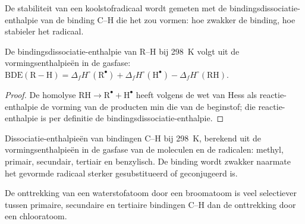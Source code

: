 De stabiliteit van een koolstofradicaal wordt gemeten met de
bindingsdissociatie-enthalpie van de binding C--H die het zou vormen:
hoe zwakker de binding, hoe stabieler het radicaal.

\begin{proposition}\label{prop:b3:radicals-carbenes:bde}
De bindingsdissociatie-enthalpie van R--H bij \qty{298}{K} volgt uit de
vormingsenthalpieën in de gasfase:
$\mathrm{BDE(R{-}H)} = \Delta_fH^\circ(\mathrm R^\bullet) + \Delta_fH^\circ(\mathrm H^\bullet) - \Delta_fH^\circ(\mathrm{RH})$.
\end{proposition}

\begin{proof}
De homolyse $\mathrm{RH \to R^\bullet + H^\bullet}$ heeft volgens de wet van Hess als reactie-enthalpie de vorming van
de producten min die van de beginstof; die reactie-enthalpie is per
definitie de bindingsdissociatie-enthalpie.
\end{proof}

\begin{omfigure}

{\small Dissociatie-enthalpieën van bindingen C--H bij \qty{298}{K},
berekend uit de vormingsenthalpieën in de gasfase van de moleculen en de
radicalen: methyl, primair, secundair, tertiair en benzylisch. De binding
wordt zwakker naarmate het gevormde radicaal sterker gesubstitueerd of
geconjugeerd is.}
\end{omfigure}

\begin{proposition}\label{prop:b3:radicals-carbenes:halogenation-selectivity}
De onttrekking van een waterstofatoom door een broomatoom is veel
selectiever tussen primaire, secundaire en tertiaire bindingen C--H dan
de onttrekking door een chlooratoom.
\end{proposition}

